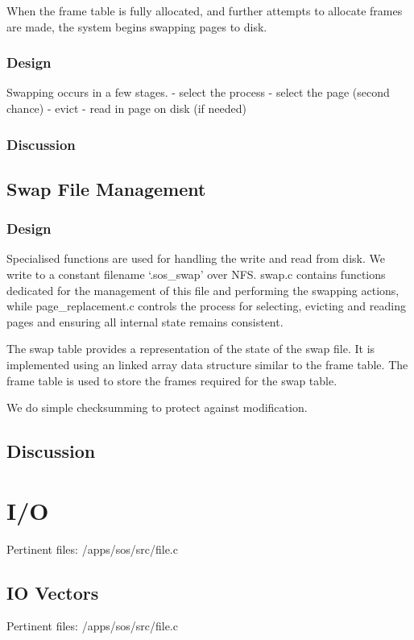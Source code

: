 \documentclass[a4paper,12pt]{article}
\begin{document}
When the frame table is fully allocated, and further attempts to allocate
frames are made, the system begins swapping pages to disk.

\subsubsection{Design}
Swapping occurs in a few stages.
- select the process
- select the page (second chance)
- evict
- read in page on disk (if needed)

\subsubsection{Discussion}

\subsection{Swap File Management}
\subsubsection{Design}
Specialised functions are used for handling the write and read from disk.  We
write to a constant filename `.sos\_swap' over NFS.  swap.c contains functions
dedicated for the management of this file and performing the swapping actions,
while page\_replacement.c controls the process for selecting, evicting and
reading pages and ensuring all internal state remains consistent.

The swap table provides a representation of the state of the swap file.  It is
implemented using an linked array data structure similar to the frame table.
The frame table is used to store the frames required for the swap table.

We do simple checksumming to protect against modification.
\subsection{Discussion}


\section{I/O}
Pertinent files: /apps/sos/src/file.c

\subsection{IO Vectors}
Pertinent files: /apps/sos/src/file.c
\end{document}
